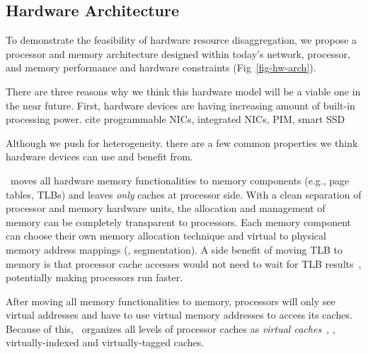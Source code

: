 \documentclass[10pt,times,twocolumn]{z2-article}
\begin{document}
{{{{{{{
\subsection{Hardware Architecture}
\label{sec:hardware}
To demonstrate the feasibility of hardware resource disaggregation,
we propose a processor and memory architecture designed 
within today's network, processor, and memory performance and hardware constraints
(Fig~\ref{fig-hw-arch}).

There are three reasons why we think this hardware model will be a viable one in the near future.
First, hardware devices are having increasing amount of built-in processing power.
cite programmable NICs, integrated NICs, PIM, smart SSD

Although we push for heterogeneity. there are a few common properties we think 
hardware devices can use and benefit from.
\fi

\lego\ moves all hardware memory functionalities to memory components 
(e.g., page tables, TLBs) and leaves {\em only} caches at processor side. 
With a clean separation of processor and memory hardware units, 
the allocation and management of memory can be completely transparent to processors.
Each memory component can choose their own memory allocation technique
and virtual to physical memory address mappings (\eg, segmentation). 
A side benefit of moving TLB to memory is that processor cache accesses would not 
need to wait for TLB results~\cite{Kaxiras-ISCA13}, potentially making processors run faster.

After moving all memory functionalities to memory, %
processors will only see virtual addresses and have to use virtual memory addresses to access its caches. 
Because of this, \lego\ organizes all levels of processor caches as {\em virtual caches}~\cite{Goodman-ASPLOS87,Wang-ISCA89},
\ie, virtually-indexed and virtually-tagged caches.

}}}}}}}
\end{document}
